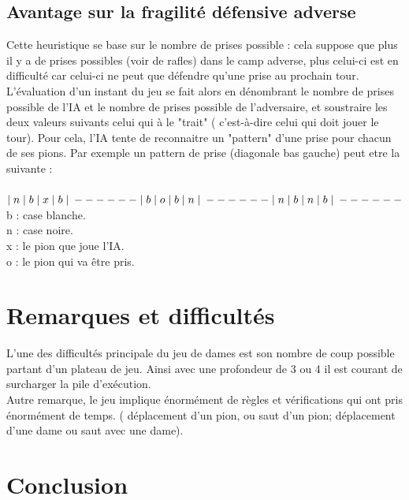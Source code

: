 \documentclass[10pt,a4paper]{report}
\begin{document}
	\subsection{Avantage sur la fragilité défensive adverse }
	Cette heuristique se base sur le nombre de prises possible : cela suppose que plus il y a de prises possibles (voir de rafles) dans le camp adverse, plus celui-ci est en difficulté car celui-ci ne peut que défendre qu'une prise au prochain tour.\\
	L'évaluation d'un instant du jeu se fait alors en dénombrant le nombre de prises possible de l'IA et le nombre de prises possible de l'adversaire, et soustraire les deux valeurs suivants celui qui à le "trait" ( c'est-à-dire celui qui doit jouer le tour).
	Pour cela, l'IA tente de reconnaitre un "pattern" d'une prise pour chacun de ses pions. Par exemple un pattern de prise (diagonale bas gauche) peut etre la suivante :\\
	\\
	$\mid n \mid b \mid x \mid b \mid\\
	------\\
	\mid b \mid o \mid b \mid n \mid\\
	------\\
	\mid n \mid b \mid n \mid b \mid\\
	------\\ $
	\\
	b : case blanche.\\
	n : case noire.\\
	x : le pion que joue l'IA.\\
	o : le pion qui va être pris.\\
\section{Remarques et difficultés}

L'une des difficultés principale du jeu de dames est son nombre de coup possible partant d'un plateau de jeu. Ainsi avec une profondeur de 3 ou 4 il est courant de surcharger la pile d'exécution. \\

Autre remarque, le jeu implique énormément de règles et vérifications qui ont pris énormément de temps.
( déplacement d'un pion, ou saut d'un pion; déplacement d'une dame ou saut avec une dame). \\

\section{Conclusion}
\end{document}
